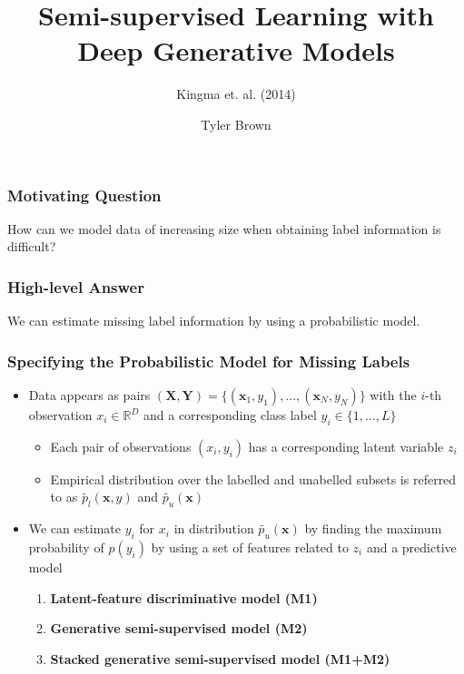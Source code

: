 \documentclass{beamer}
\title{Semi-supervised Learning with Deep Generative Models}
\subtitle{Kingma et. al. (2014)}
\author{Tyler Brown}
\institute{CS 7180}
\date{}
\begin{document}
 
\frame{\titlepage}
 
\begin{frame}
  \frametitle{Motivating Question}
  How can we model data of increasing size when obtaining label 
  information is difficult?
\end{frame}

\begin{frame}
  \frametitle{High-level Answer}

  We can estimate missing label information by
  using a probabilistic model.
  
\end{frame}

\begin{frame}
  \frametitle{Specifying the Probabilistic Model for Missing Labels}

    \begin{itemize}
  \item Data appears as pairs $(\mathbf{X}, \mathbf{Y}) =
    \{(\mathbf{x}_1, y_1), ..., (\mathbf{x}_N, y_N)\}$
  with the $i$-th observation $x_i \in \mathbb{R}^D$ and a
  corresponding class label $y_i \in \{1, ..., L\}$

  \begin{itemize}
\item Each pair of observations $(x_i,y_i)$ has a corresponding
  latent variable $z_i$

\item Empirical distribution over the labelled and unabelled subsets
  is referred to as $\tilde{p_l}(\mathbf{x}, y)$ and
  $\tilde{p_u}(\mathbf{x})$
  \end{itemize}
\item We can estimate $y_i$ for $x_i$ in distribution
  $\tilde{p_u}(\mathbf{x})$ by finding the maximum
  probability of $p(y_i)$ by using a set of features
  related to $z_i$ and a predictive model
  \begin{enumerate}
  \item \textbf{Latent-feature discriminative model (M1)}
  \item \textbf{Generative semi-supervised model (M2)}
  \item \textbf{Stacked generative semi-supervised model (M1+M2)}
  \end{enumerate}
  \end{itemize}
  \end{frame}
\end{document}
